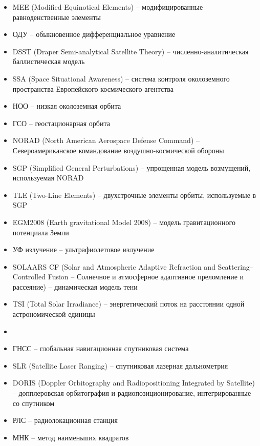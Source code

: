 \begin{itemize}
    \item MEE (Modified Equinotical Elements) -- модифицированные равноденственные элементы
    \item ОДУ -- обыкновенное дифференциальное уравнение
    \item DSST (Draper Semi-analytical Satellite Theory) -- численно-аналитическая баллистическая модель
    \item SSA (Space Situational Awareness) -- система контроля околоземного пространства Европейского космического агентства
    \item НОО -- низкая околоземная орбита
    \item ГСО -- геостационарная орбита
    \item NORAD (North American Aerospace Defense Command) -- Североамериканское командование воздушно-космической обороны
    \item SGP (Simplified General Perturbations) -- упрощенная модель возмущений, используемая NORAD
    \item TLE (Two-Line Elements) -- двухстрочные элементы орбиты, используемые в SGP
    \item EGM2008 (Earth gravitational Model 2008) -- модель гравитационного потенциала Земли
    \item УФ излучение -- ультрафиолетовое излучение
    \item SOLAARS CF (Solar and Atmospheric Adaptive Refraction and Scattering–Controlled Fusion
    -- Солнечное и атмосферное адаптивное преломление и рассеяние) -- динамическая модель тени
    \item TSI (Total Solar Irradiance) -- энергетический поток на расстоянии одной астрономической единицы
    \item  \item ГНСС -- глобальная навигационная спутниковая система
    \item SLR (Satellite Laser Ranging) -- спутниковая лазерная дальнометрия
    \item DORIS (Doppler Orbitography and Radiopositioning Integrated by Satellite) -- допплеровская орбитография и радиопозиционирование, интегрированные со спутником
    \item РЛС -- радиолокационная станция
    \item МНК -- метод наименьших квадратов
\end{itemize}

\newpage